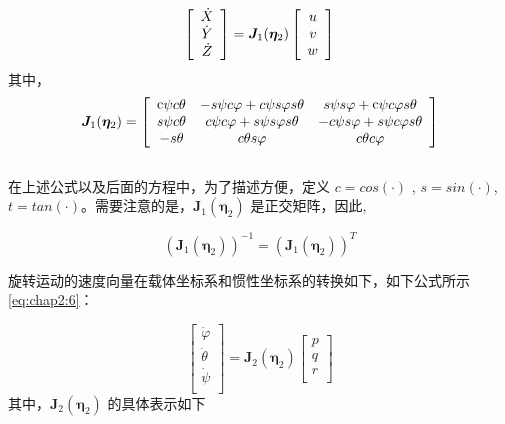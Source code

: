 \begin{equation}
\centering
\label{eq:chap2:3}
\left[ {\begin{array}{*{20}{c}}
   {\dot X}  \\
   {\dot Y}  \\
   {\dot Z}  \\
\end{array}} \right] =
 {{\bm{J}}_{1}(\bm{\eta}_{2})}
\left[ {\begin{array}{*{20}{c}}
   u  \\
   v  \\
   w  \\
\end{array}} \right]
\end{equation}
其中，
\begin{equation*}
\centering
\label{eq:chap2:4}
{{\bm{J}}_{1}(\bm{\eta} _{2})} =
\left[
{\begin{array}{*{20}{c}}
   {{\mathop{\rm c}\nolimits}  \psi  c \theta  } & { - s \psi  c \varphi   + c \psi  s \varphi  s \theta  } & {s \psi  s \varphi   + {\mathop{\rm c}\nolimits}  \psi  c \varphi  s \theta  }  \\
   {s \psi  c \theta  } & {c \psi  c \varphi   + s \psi  s \varphi  s \theta  } & { - c \psi  s \varphi   + s \psi  c \varphi  s \theta  }  \\
   { - s \theta  } & {c \theta  s \varphi  } & {c \theta  c \varphi  }  \\
\end{array}}
\right]
\end{equation*}
\\
在上述公式以及后面的方程中，为了描述方便，定义 $ c= cos(·)$ ,  $s = sin(·)$, $t = tan(·)$。需要注意的是，${{\bm{J}}_{1}(\bm{\eta} _{2})}$ 是正交矩阵，因此,

\begin{equation}
\label{eq:chap2:5}
({{\bm{J}}_{1}(\bm{\eta} _{2})})^{-1} = ({{\bm{J}}_{1}(\bm{\eta} _{2})})^T
\end{equation}

旋转运动的速度向量在载体坐标系和惯性坐标系的转换如下，如下公式所示\ref{eq:chap2:6}：

\begin{equation}
\label{eq:chap2:6}
\left[ {\begin{array}{*{20}{c}}
   \dot \varphi   \\
   \dot \theta   \\
   \dot \psi   \\
\end{array}} \right] = {\bm{J}_2(\bm{\eta}_2)}
\left[ {\begin{array}{*{20}{c}}
   p  \\
   q  \\
   r  \\
\end{array}} \right]
\end{equation}
其中，${\bm{J}_2(\bm{\eta}_2)}$ 的具体表示如下

